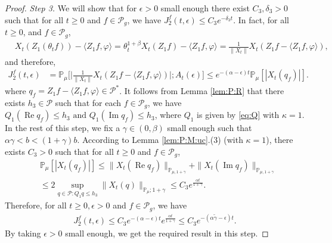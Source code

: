 \documentclass[EJP]{ejpecp} %
\begin{document}
\begin{proof}
\emph{Step 3.}
We will show that for $\epsilon>0$ small enough there exist $C_3, \delta_3 > 0$ such that for all $t \geq 0$ and $f\in \mathcal P_g$,  we have $ J^f_2(t,\epsilon) \leq C_3 e^{-\delta_3 t}$.
In fact, for all $t\geq 0$, and $f\in \mathcal P_g$,
\begin{align}
  & X_{t}(Z_1(\theta_t f))- \langle Z_1f, \varphi\rangle
     = \theta_t^{1+\beta} X_t(Z_1 f) - \langle  Z_1 f,\varphi \rangle
     = \frac{1}{\|X_{t}\|}X_t(Z_1f - \langle  Z_1 f ,\varphi \rangle),
\end{align}
and therefore,
\begin{align}
  \label{eq: prevJ2}
  J^f_2(t,\epsilon)
  & = \mathbb P_\mu\Big[\Big|  \frac{1}{\|X_{t}\|}X_t(Z_1f - \langle  Z_1 f ,\varphi \rangle) \Big|;A_t(\epsilon)\Big]
    \leq e^{-(\alpha-\epsilon)t} \mathbb{P}_{\mu}[|X_t (q_f) |].
\end{align}
where $ q_f = Z_1 f-\langle  Z_1 f,\varphi\rangle \in \mathcal P^*$.
It follows from Lemma \ref{lem:P:R} that there exists $h_{3}\in \mathcal{P}$ such that for each $ f\in \mathcal P_g$, we have $Q_1 (\operatorname{Re} q_f) \leq h_{3} \text{ and } Q_1 (\operatorname{Im} q_f)\leq h_3$, where $Q_1$ is given by \eqref{eq:Q} with $\kappa=1$.
In the rest of this step, we  fix a $\gamma\in(0,\beta)$ small enough such that $\alpha \gamma < b < (1+\gamma)b$.
According to Lemma \ref{lem:P:M:uc}.(3) (with $\kappa=1$), there exists $C_{3}>0$ such that for all $t\geq 0$ and $f\in \mathcal P_g$,
\begin{align}
  & \mathbb{P}_{\mu}\left[\left|X_{t}(q_f)\right|\right]
    \leq \| X_{t}( \operatorname{Re} q_f)\|_{\mathbb{P}_{\mu,1+\gamma}} + \| X_{t}(\operatorname{Im} q_f)\|_{\mathbb{P}_{\mu,1+\gamma}} \\
 & \leq 2\sup_{q\in \mathcal P: Q_1 q\leq h_{3}} \|X_t(q)\|_{\mathbb P_\mu; 1+\gamma} \leq C_{3} e^{\frac{\alpha t}{1+\gamma}}.
\end{align}
Therefore, for all $t\geq 0, \epsilon > 0$ and $f \in \mathcal P_g$, we have
\begin{align}
  \label{eq: right bound for J2}
   J^f_2(t, \epsilon)
    \leq  C_3 e^{-(\alpha-\epsilon)t}e^{\frac{\alpha t}{1+\gamma}}
   \leq C_{3} e^{-(\alpha\tilde \gamma -\epsilon)t}.
\end{align}
By taking $\epsilon >0$ small enough, we get the required result in this step.


\end{proof}
\end{document}
